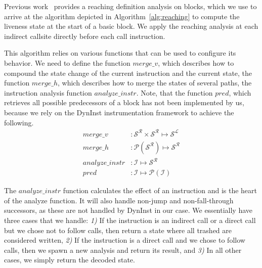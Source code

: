 Previous work~\cite{khedker2009data} provides a reaching definition analysis on blocks, which we use to arrive at the algorithm depicted in 
Algorithm~\ref{alg:reaching} to compute the liveness state at the start of a basic block. We apply the reaching analysis at each indirect 
callsite directly before each call instruction.

This algorithm relies on various functions that can be used to configure its behavior. We need to define the 
function $merge\_v$, which describes how to compound the state change of the current instruction and the current state, 
the function $merge\_h$, which describes how to merge the states of several paths, the instruction analysis function
$analyze\_instr$. Note, that the function $pred$, which retrieves all possible predecessors of a block has not been implemented by us, because we rely on the DynInst instrumentation 
framework to achieve the following.
\vspace{-.1cm}
\begin{subequations}
\label{eq:livenesscustom}
\begin{align}
merge\_v &: \mathcal{S}^\mathcal{R} \times \mathcal{S}^\mathcal{R} \mapsto \mathcal{S}^\mathcal{L}\\
merge\_h &: \mathcal{P}(\mathcal{S}^\mathcal{R}) \mapsto \mathcal{S}^\mathcal{R}\\
analyze\_instr &: \mathcal {I} \mapsto \mathcal{S}^\mathcal{R} \\
pred &: \mathcal{I} \mapsto \mathcal{P}(\mathcal{I})
\end{align}
\end{subequations}
\vspace{-.6cm}

The $analyze\_instr$ function calculates the effect of an instruction and is the heart of the analyze function. It will also 
handle non-jump and non-fall-through successors, as these are not handled by DynInst in our case. We essentially have three cases that we handle:
\textit{1)} If the instruction is an indirect call or a direct call but we chose not to follow calls, then return a state where all trashed are considered written,
\textit{2)} If the instruction is a direct call and we chose to follow calls, then we spawn a new analysis and return its result, and
\textit{3)} In all other cases, we simply return the decoded state.


